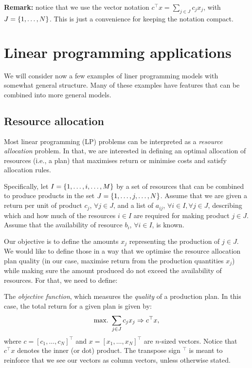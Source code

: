 {\bf Remark:} notice that we use the vector notation $c^\top x = \sum_{j \in J} c_j x_j$, with $J = \left\{ 1,\dots,N \right \}$. This is just a convenience for keeping the notation compact. 


\section{Linear programming applications}

We will consider now a few examples of liner programming models with somewhat general structure. Many of these examples have features that can be combined into more general models.


\subsection{Resource allocation} \label{section_121}

Most linear programming (LP) problems can be interpreted as a \emph{resource allocation} problem. In that, we are interested in defining an optimal allocation of resources (i.e., a plan) that maximises return or minimise costs and satisfy allocation rules. 

Specifically, let $I = \left\{ 1, \dots, i, \dots, M \right \}$ by a set of resources that can be combined to produce products in the set $J = \left\{ 1, \dots, j, \dots, N \right \}$. Assume that we are given a return per unit of product $c_j$, $\forall j\in J$, and a list of $a_{ij}$, $\forall i \in I, \forall j \in J$, describing which and how much of the resources $i \in I$ are required for making product $j \in J$. Assume that the availability of resource $b_i$, $\forall i\in I$, is known. 

Our objective is to define the amounts $x_j$ representing the production of $j \in J$. We would like to define those in a way that we optimise the resource allocation plan quality (in our case, maximise return from the production quantities $x_j$) while making sure the amount produced do not exceed the availability of resources. For that, we need to define: 

The \emph{objective function}, which measures the \emph{quality} of a production plan. In this case, the total return for a given plan is given by:
%
\begin{equation*}
	\mathop{\text{max.~}} \sum_{j \in J}c_jx_j \Rightarrow c^\top x,
\end{equation*}
%
where $c = [c_1, \dots, c_{N}]^\top$ and $x = [x_1, \dots, x_{N}]^\top$ are $n$-sized vectors. Notice that $c^\top x$ denotes the inner (or dot) product. The transpose sign $^\top$ is meant to reinforce that we see our vectors as column vectors, unless otherwise stated.

